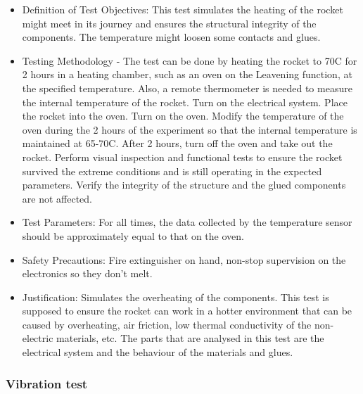 \begin{itemize}
 \item Definition of Test Objectives: This test simulates the heating of the rocket might meet in its journey and ensures the structural integrity of the components. The temperature might loosen some contacts and glues.
 \item Testing Methodology - The test can be done by heating the rocket to 70C for 2 hours in a heating chamber, such as an oven on the Leavening function, at the specified temperature. Also, a remote thermometer is needed to measure the internal temperature of the rocket. Turn on the electrical system. Place the rocket into the oven. Turn on the oven. Modify the temperature of the oven during the 2 hours of the experiment so that the internal temperature is maintained at 65-70C. After 2 hours, turn off the oven and take out the rocket. Perform visual inspection and functional tests to ensure the rocket survived the extreme conditions and is still operating in the expected parameters. Verify the integrity of the structure and the glued components are not affected.
 \item Test Parameters: For all times, the data collected by the temperature sensor should be approximately equal to that on the oven.
 \item Safety Precautions: Fire extinguisher on hand, non-stop supervision on the electronics so they don't melt.
 \item Justification: Simulates the overheating of the components. This test is supposed to ensure the rocket can work in a hotter environment that can be caused by overheating, air friction, low thermal conductivity of the non-electric materials, etc. The parts that are analysed in this test are the electrical system and the behaviour of the materials and glues. 
\end{itemize}

\subsubsection{Vibration test}

